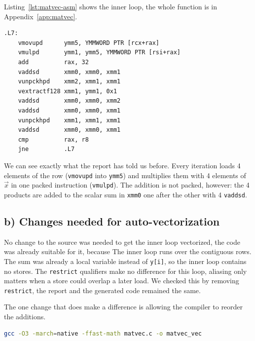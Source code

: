 \documentclass[a4paper,11pt]{article}
\begin{document}
Listing~\ref{lst:matvec-asm} shows the inner loop, the whole function is in
Appendix~\ref{app:matvec}.

\begin{lstlisting}[language={}, caption={Inner loop of \texttt{matvec} with \texttt{-O3 -march=native}.}, label={lst:matvec-asm}]
.L7:
    vmovupd      ymm5, YMMWORD PTR [rcx+rax]
    vmulpd       ymm1, ymm5, YMMWORD PTR [rsi+rax]
    add          rax, 32
    vaddsd       xmm0, xmm0, xmm1
    vunpckhpd    xmm2, xmm1, xmm1
    vextractf128 xmm1, ymm1, 0x1
    vaddsd       xmm0, xmm0, xmm2
    vaddsd       xmm0, xmm0, xmm1
    vunpckhpd    xmm1, xmm1, xmm1
    vaddsd       xmm0, xmm0, xmm1
    cmp          rax, r8
    jne          .L7
\end{lstlisting}

We can see exactly what the report has told us before.
Every iteration loads 4 elements of the row (\texttt{vmovupd} into \texttt{ymm5}) and multiplies them with 4 elements of
$\vec{x}$ in one packed instruction (\texttt{vmulpd}). The addition is not
packed, however: the 4 products are added to the scalar sum in
\texttt{xmm0} one after the other with 4 \texttt{vaddsd}.


\subsection{b) Changes needed for auto-vectorization}

No change to the source was needed to get the inner loop vectorized, the
code was already suitable for it, because The inner loop runs over the contiguous rows.
The sum was already a local variable instead of \texttt{y[i]}, so the inner loop contains no stores.
The \texttt{restrict} qualifiers make no difference for this loop, aliasing only matters when
a store could overlap a later load. We checked this by removing
\texttt{restrict}, the report and the generated code remained the same.

\medskip
The one change that does make a difference is allowing the compiler to
reorder the additions.

\begin{lstlisting}[language=bash]
gcc -O3 -march=native -ffast-math matvec.c -o matvec_vec
\end{lstlisting}
\end{document}
